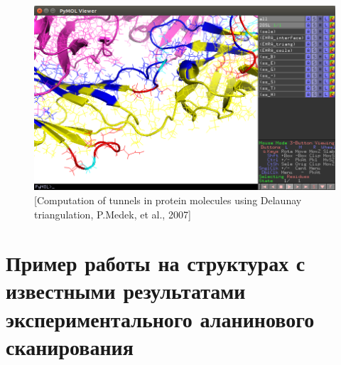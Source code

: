 

\begin{figure}
\includegraphics[width=\linewidth]{loops4.png}

\caption{\small{[Computation of tunnels in protein molecules using
Delaunay triangulation, P.Medek, et al., 2007]
 }}
\label{fig:loops4}
\end{figure}


\newpage




\newpage
\section{Пример работы на структурах с известными результатами  экспериментального аланинового сканирования}



